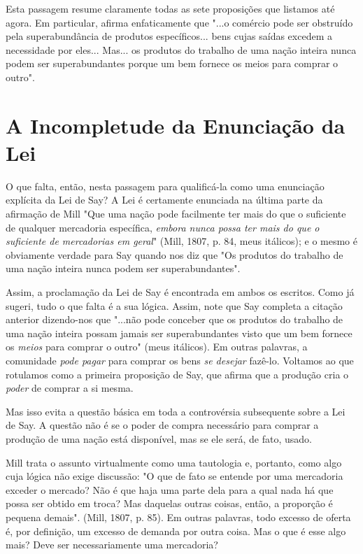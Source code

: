 \documentclass[12pt]{article}
\begin{document}
Esta passagem resume claramente todas as sete proposições que listamos até agora. Em particular, afirma enfaticamente que "...o comércio pode ser obstruído pela superabundância de produtos específicos... bens cujas saídas excedem a necessidade por eles... Mas... os produtos do trabalho de uma nação inteira nunca podem ser superabundantes porque um bem fornece os meios para comprar o outro".

\section{A Incompletude da Enunciação da Lei}

O que falta, então, nesta passagem para qualificá-la como uma enunciação explícita da Lei de Say? A Lei é certamente enunciada na última parte da afirmação de Mill "Que uma nação pode facilmente ter mais do que o suficiente de qualquer mercadoria específica, \textit{embora nunca possa ter mais do que o suficiente de mercadorias em geral}" (Mill, 1807, p. 84, meus itálicos); e o mesmo é obviamente verdade para Say quando nos diz que "Os produtos do trabalho de uma nação inteira nunca podem ser superabundantes".

Assim, a proclamação da Lei de Say é encontrada em ambos os escritos. Como já sugeri, tudo o que falta é a sua lógica. Assim, note que Say completa a citação anterior dizendo-nos que "...não pode conceber que os produtos do trabalho de uma nação inteira possam jamais ser superabundantes visto que um bem fornece os \textit{meios} para comprar o outro" (meus itálicos). Em outras palavras, a comunidade \textit{pode pagar} para comprar os bens \textit{se desejar} fazê-lo. Voltamos ao que rotulamos como a primeira proposição de Say, que afirma que a produção cria o \textit{poder} de comprar a si mesma.

Mas isso evita a questão básica em toda a controvérsia subsequente sobre a Lei de Say. A questão não é se o poder de compra necessário para comprar a produção de uma nação está disponível, mas se ele será, de fato, usado.

Mill trata o assunto virtualmente como uma tautologia e, portanto, como algo cuja lógica não exige discussão: "O que de fato se entende por uma mercadoria exceder o mercado? Não é que haja uma parte dela para a qual nada há que possa ser obtido em troca? Mas daquelas outras coisas, então, a proporção é pequena demais". (Mill, 1807, p. 85). Em outras palavras, todo excesso de oferta é, por definição, um excesso de demanda por outra coisa. Mas o que é esse algo mais? Deve ser necessariamente uma mercadoria?
\end{document}
